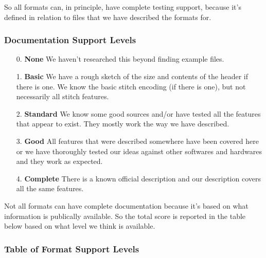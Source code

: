 \documentclass[a4paper, 11pt]{report}
\begin{document}
So all formats can, in principle, have complete testing support, because it's defined in relation to files that we have described the formats for.

\subsubsection{Documentation Support Levels}

\begin{enumerate}
\item[0.] \textbf{None} We haven't researched this beyond finding example files.
\item[1.] \textbf{Basic} We have a rough sketch of the size and contents of the header if there is one. We know the basic stitch encoding (if there is one), but not necessarily all stitch features. 
\item[2.] \textbf{Standard} We know some good sources and/or have tested all the features that appear to exist. They mostly work the way we have described.
\item[3.] \textbf{Good} All features that were described somewhere have been covered here or we have thoroughly tested our ideas against other softwares and hardwares and they work as expected. 
\item[4.] \textbf{Complete} There is a known official description and our description covers all the same features.
\end{enumerate}

Not all formats can have complete documentation because it's based on what 
information is publically available. So the total score is reported in the table
below based on what level we think is available.

\subsubsection{Table of Format Support Levels}
\end{document}
